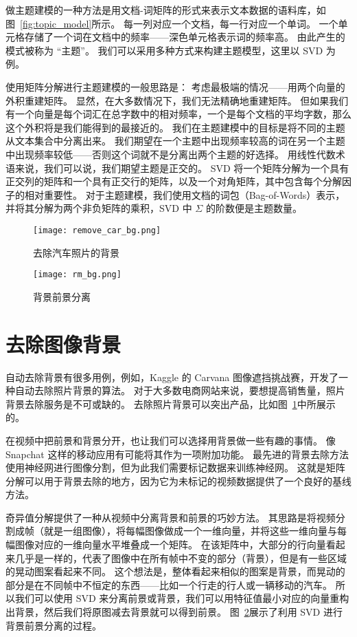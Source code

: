 做主题建模的一种方法是用文档-词矩阵的形式来表示文本数据的语料库，如图~\ref{fig:topic_model}所示。
每一列对应一个文档，每一行对应一个单词。
一个单元格存储了一个词在文档中的频率——深色单元格表示词的频率高。
由此产生的模式被称为 “主题”。
我们可以采用多种方式来构建主题模型，这里以 SVD 为例。

使用矩阵分解进行主题建模的一般思路是：
考虑最极端的情况——用两个向量的外积重建矩阵。
显然，在大多数情况下，我们无法精确地重建矩阵。
但如果我们有一个向量是每个词汇在总字数中的相对频率，一个是每个文档的平均字数，那么这个外积将是我们能得到的最接近的。
我们在主题建模中的目标是将不同的主题从文本集合中分离出来。
我们期望在一个主题中出现频率较高的词在另一个主题中出现频率较低——否则这个词就不是分离出两个主题的好选择。
用线性代数术语来说，我们可以说，我们期望主题是正交的。
SVD 将一个矩阵分解为一个具有正交列的矩阵和一个具有正交行的矩阵，以及一个对角矩阵，其中包含每个分解因子的相对重要性。
对于主题建模，我们使用文档的词包（Bag-of-Words）表示，并将其分解为两个非负矩阵的乘积，SVD 中 $\Sigma$ 的阶数便是主题数量。

\begin{figure}[!htp]
	\centering
	\texttt{[image: remove\_car\_bg.png]}
	\caption{去除汽车照片的背景}
	\label{fig:rm_car_bg}
\end{figure}

\begin{figure}[!htp]
	\centering
	\texttt{[image: rm\_bg.png]}
	\caption{背景前景分离}
	\label{fig:rm_bg}
\end{figure}

\section{去除图像背景}
自动去除背景有很多用例，例如，Kaggle 的 Carvana 图像遮挡挑战赛，开发了一种自动去除照片背景的算法。
对于大多数电商网站来说，要想提高销售量，照片背景去除服务是不可或缺的。
去除照片背景可以突出产品，比如图~\ref{fig:rm_car_bg}中所展示的。

在视频中把前景和背景分开，也让我们可以选择用背景做一些有趣的事情。
像 Snapchat 这样的移动应用有可能将其作为一项附加功能。
最先进的背景去除方法使用神经网进行图像分割，但为此我们需要标记数据来训练神经网。
这就是矩阵分解可以用于背景去除的地方，因为它为未标记的视频数据提供了一个良好的基线方法。

奇异值分解提供了一种从视频中分离背景和前景的巧妙方法。
其思路是将视频分割成帧（就是一组图像），将每幅图像做成一个一维向量，并将这些一维向量与每幅图像对应的一维向量水平堆叠成一个矩阵。
在该矩阵中，大部分的行向量看起来几乎是一样的，代表了图像中在所有帧中不变的部分（背景），但是有一些区域的晃动图案看起来不同。
这个想法是，整体看起来相似的图案是背景，而晃动的部分是在不同帧中不恒定的东西——比如一个行走的行人或一辆移动的汽车。
所以我们可以使用 SVD 来分离前景或背景，我们可以用特征值最小对应的向量重构出背景，然后我们将原图减去背景就可以得到前景。
图~\ref{fig:rm_bg}展示了利用 SVD 进行背景前景分离的过程。

